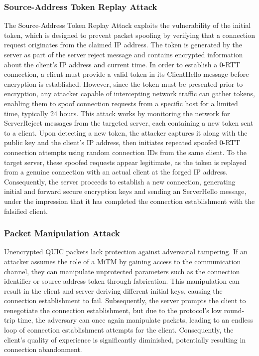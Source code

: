 \subsubsection{Source-Address Token Replay Attack}

The Source-Address Token Replay Attack exploits the vulnerability of the initial token, which is designed to prevent packet spoofing by verifying that a connection request originates from the claimed IP address. The token is generated by the server as part of the server reject message and contains encrypted information about the client's IP address and current time. In order to establish a 0-RTT connection, a client must provide a valid token in its 
ClientHello message before encryption is established.
However, since the token must be presented prior to encryption, any attacker capable of intercepting network traffic can gather tokens, enabling them to spoof connection requests from a specific host for a limited time, typically 24 hours. This attack works by monitoring the network for ServerReject messages from the targeted server, each containing a new token sent to a client. Upon detecting a new token, the attacker captures it along with the public key and the client's IP address, then initiates repeated spoofed 0-RTT connection attempts using random connection IDs from the same client.
To the target server, these spoofed requests appear legitimate, as the token is replayed from a genuine connection with an actual client at the forged IP address. Consequently, the server proceeds to establish a new connection, generating initial and forward secure encryption keys and sending an ServerHello message, under the impression that it has completed the connection establishment with the falsified client.

\subsubsection{Packet Manipulation Attack}

Unencrypted QUIC packets lack protection against adversarial tampering. If an attacker assumes the role of a MiTM by gaining access to the communication channel, they can manipulate unprotected parameters such as the connection identifier or source address token through fabrication. This manipulation can result in the client and server deriving different initial keys, causing the connection establishment to fail. Subsequently, the server prompts the client to renegotiate the connection establishment, but due to the protocol's low round-trip time, the adversary can once again manipulate packets, leading to an endless loop of connection establishment attempts for the client. Consequently, the client's quality of experience is significantly diminished, potentially resulting in connection abandonment.

